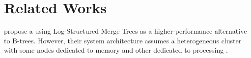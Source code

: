 \section{Related Works}

\citeauthor{dlsm} propose a using Log-Structured Merge Trees as a higher-performance alternative to B-trees. However, their system architecture assumes a heterogeneous cluster with some nodes dedicated to memory and other dedicated to processing \cite{dlsm}.
